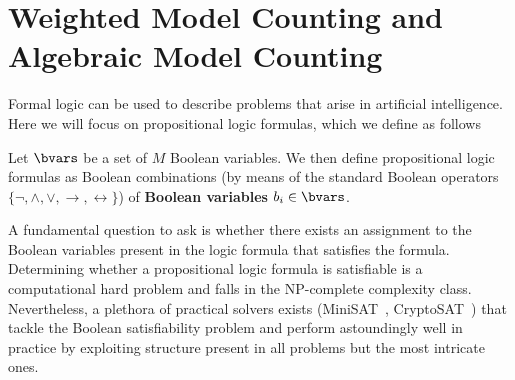 \section{Weighted Model Counting and Algebraic Model Counting} \label{app:amc}



Formal logic can be used to describe problems that arise in artificial intelligence. Here we will focus on propositional logic formulas, which we define as follows
\begin{definition}\label{def:preplogic}
	Let $\bvars$ be a set of $M$ Boolean variables.
	We then define propositional logic formulas as Boolean combinations (by means of the standard Boolean operators $\{\neg, \land, \lor, \rightarrow, \leftrightarrow \}$) of {\bf Boolean variables} $b_i \in \bvars$.
\end{definition}

A fundamental question to ask is whether there exists an assignment to the Boolean variables present in the logic formula that satisfies the formula.
Determining whether a propositional logic formula is satisfiable is a computational hard problem and falls in the NP-complete complexity class. Nevertheless, a plethora of practical solvers exists (\eg MiniSAT~\citep{sorensson2005minisat}, CryptoSAT~\citep{lafitte2018cryptosat}) that tackle the Boolean satisfiability problem and perform astoundingly well in practice by exploiting structure present in all problems but the most intricate ones. 

